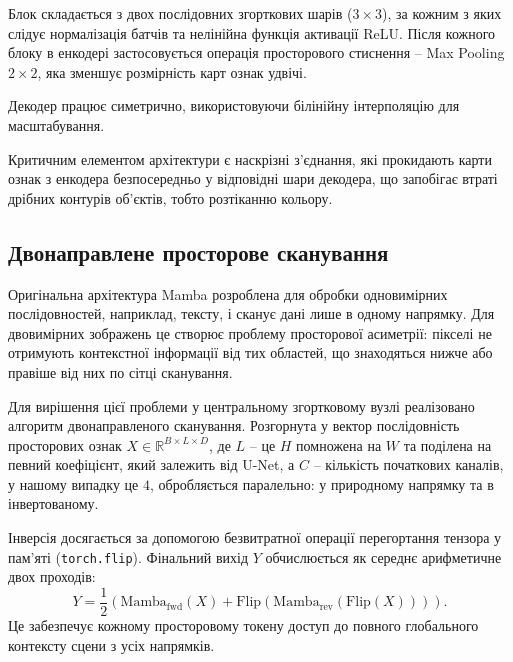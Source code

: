             Блок складається з двох послідовних згорткових шарів ($3 \times 3$), за кожним з яких слідує нормалізація батчів та нелінійна функція активації ReLU.
            Після кожного блоку в енкодері застосовується операція просторового стиснення -- Max Pooling $2 \times 2$, яка зменшує розмірність карт ознак удвічі.
            
            Декодер працює симетрично, використовуючи білінійну інтерполяцію для масштабування.
            
            Критичним елементом архітектури є наскрізні з'єднання, які прокидають карти ознак з енкодера безпосередньо у відповідні шари декодера,
            що запобігає втраті дрібних контурів об'єктів, тобто розтіканню кольору.%

        \subsection{Двонаправлене просторове сканування}
            Оригінальна архітектура Mamba розроблена для обробки одновимірних послідовностей, наприклад, тексту, і сканує дані лише в одному напрямку.
            Для двовимірних зображень це створює проблему просторової асиметрії: пікселі не отримують контекстної інформації від тих областей, що знаходяться нижче або правіше від них по сітці сканування.

            Для вирішення цієї проблеми у центральному згортковому вузлі реалізовано алгоритм двонаправленого сканування.
            Розгорнута у вектор послідовність просторових ознак $X \in \mathbb{R}^{B \times L \times D}$, де $L$ -- це $H$ помножена на $W$ та поділена на певний коефіцієнт, який залежить від U-Net, а $C$ -- кількість початкових каналів, у нашому випадку це $4$, обробляється паралельно: у природному напрямку та в інвертованому.
            
            Інверсія досягається за допомогою безвитратної операції перегортання тензора у пам'яті (\texttt{torch.flip}).
            Фінальний вихід $Y$ обчислюється як середнє арифметичне двох проходів:
            \begin{equation*}
                Y = \frac{1}{2} \left( \mathrm{Mamba}_{\mathrm{fwd}}(X) + \mathrm{Flip}(\mathrm{Mamba}_{\mathrm{rev}}(\mathrm{Flip}(X))) \right).
            \end{equation*}
            Це забезпечує кожному просторовому токену доступ до повного глобального контексту сцени з усіх напрямків.

